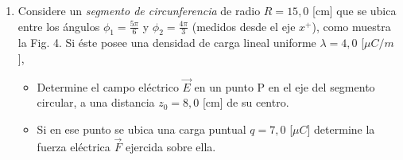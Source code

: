 \documentclass[12pt,onecolumn]{article}
\begin{document}
\begin{enumerate}
\begin{itemize}
\item El campo el\'{e}ctrico $\vec{E}$ inducido por la barra en el punto $P$

\item La fuerza el\'{e}ctrica $\vec{F}$ sobre la carga $q.$
\end{itemize}

\begin{center}
\\[-2pt]
{\small \textbf{Figura 3}}
\end{center}

\item Considere un \emph{segmento de circunferencia} de radio $R=15,0$ [cm]
que se ubica entre los \'{a}ngulos $\phi_{1}=\frac{5\pi}{6}$ y
$\phi_{2}=\frac{4\pi}{3}$ (medidos desde el eje $x^{+}$), como muestra la
Fig. 4. Si \'{e}ste posee una densidad de carga lineal uniforme
$\lambda =4,0$ [$\mu C/m$],

\begin{itemize}
\item Determine el campo el\'{e}ctrico $\vec{E}$ en un punto P en el eje del segmento circular,
a una distancia $z_{0}=8,0$ [cm] de su centro.

\item Si en ese punto se ubica una carga puntual $q=7,0$ [$\mu C$] determine la fuerza el\'{e}ctrica $\vec{F}$ ejercida sobre ella.
\end{itemize}


\end{enumerate}
\end{document}
